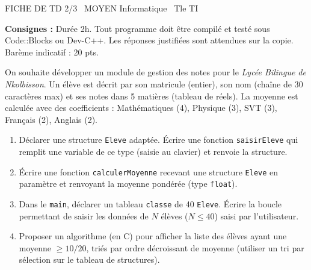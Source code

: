 \documentclass[11pt]{article}
\begin{document}
\begin{tcolorbox}[enhanced,colback=popink,colframe=popink,arc=10pt,boxrule=0pt,left=12pt,right=12pt,top=9pt,bottom=9pt]
{\color{white}\popxbold\small FICHE DE TD 2/3 \textbullet\ MOYEN \hfill Informatique \textbullet\ Tle TI\par}
\end{tcolorbox}
\vspace{4pt}
\noindent \textbf{Consignes :} Durée 2h. Tout programme doit être compilé et testé sous Code::Blocks ou Dev-C++. Les réponses justifiées sont attendues sur la copie. Barème indicatif : 20 pts.

\begin{exercice}
On souhaite développer un module de gestion des notes pour le \textit{Lycée Bilingue de Nkolbisson}. Un élève est décrit par son matricule (entier), son nom (chaîne de 30 caractères max) et ses notes dans 5 matières (tableau de réels). La moyenne est calculée avec des coefficients : Mathématiques (4), Physique (3), SVT (3), Français (2), Anglais (2).

\begin{enumerate}
    \item Déclarer une structure \texttt{Eleve} adaptée. Écrire une fonction \texttt{saisirEleve} qui remplit une variable de ce type (saisie au clavier) et renvoie la structure.
    \item Écrire une fonction \texttt{calculerMoyenne} recevant une structure \texttt{Eleve} en paramètre et renvoyant la moyenne pondérée (type \texttt{float}).
    \item Dans le \texttt{main}, déclarer un tableau \texttt{classe} de 40 \texttt{Eleve}. Écrire la boucle permettant de saisir les données de $N$ élèves ($N \le 40$) saisi par l'utilisateur.
    \item Proposer un algorithme (en C) pour afficher la liste des élèves ayant une moyenne $\ge 10/20$, triés par ordre décroissant de moyenne (utiliser un tri par sélection sur le tableau de structures).
\end{enumerate}
\end{exercice}
\end{document}
